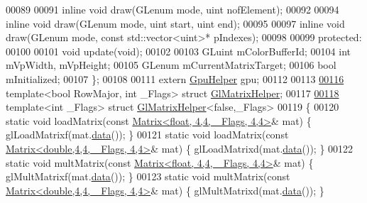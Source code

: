 \begin{DoxyCode}
00089 
00091     \textcolor{keyword}{inline} \textcolor{keywordtype}{void} draw(GLenum mode, uint nofElement);
00092 
00094     \textcolor{keyword}{inline} \textcolor{keywordtype}{void} draw(GLenum mode, uint start, uint end);
00095 
00097     \textcolor{keyword}{inline} \textcolor{keywordtype}{void} draw(GLenum mode, \textcolor{keyword}{const} std::vector<uint>* pIndexes);
00098 
00099 \textcolor{keyword}{protected}:
00100 
00101     \textcolor{keywordtype}{void} update(\textcolor{keywordtype}{void});
00102 
00103     GLuint mColorBufferId;
00104     \textcolor{keywordtype}{int} mVpWidth, mVpHeight;
00105     GLenum mCurrentMatrixTarget;
00106     \textcolor{keywordtype}{bool} mInitialized;
00107 \};
00108 
00111 \textcolor{keyword}{extern} \hyperlink{class_gpu_helper}{GpuHelper} gpu;
00112 
00113 
\hyperlink{struct_gl_matrix_helper}{00116} \textcolor{keyword}{template}<\textcolor{keywordtype}{bool} RowMajor, \textcolor{keywordtype}{int} \_Flags> \textcolor{keyword}{struct }\hyperlink{struct_gl_matrix_helper}{GlMatrixHelper};
00117 
\hyperlink{struct_gl_matrix_helper_3_01false_00_01___flags_01_4}{00118} \textcolor{keyword}{template}<\textcolor{keywordtype}{int} \_Flags> \textcolor{keyword}{struct }\hyperlink{struct_gl_matrix_helper}{GlMatrixHelper}<false,\_Flags>
00119 \{
00120     \textcolor{keyword}{static} \textcolor{keywordtype}{void} loadMatrix(\textcolor{keyword}{const} \hyperlink{group___core___module_class_eigen_1_1_matrix}{Matrix<float, 4,4, \_Flags, 4,4>}&  mat) \{ 
      glLoadMatrixf(mat.\hyperlink{class_eigen_1_1_plain_object_base_ac25699535374b1854cf8494e44ad31b2}{data}()); \}
00121     \textcolor{keyword}{static} \textcolor{keywordtype}{void} loadMatrix(\textcolor{keyword}{const} \hyperlink{group___core___module_class_eigen_1_1_matrix}{Matrix<double,4,4, \_Flags, 4,4>}& mat) \{ 
      glLoadMatrixd(mat.\hyperlink{class_eigen_1_1_plain_object_base_ac25699535374b1854cf8494e44ad31b2}{data}()); \}
00122     \textcolor{keyword}{static} \textcolor{keywordtype}{void} multMatrix(\textcolor{keyword}{const} \hyperlink{group___core___module_class_eigen_1_1_matrix}{Matrix<float, 4,4, \_Flags, 4,4>}&  mat) \{ 
      glMultMatrixf(mat.\hyperlink{class_eigen_1_1_plain_object_base_ac25699535374b1854cf8494e44ad31b2}{data}()); \}
00123     \textcolor{keyword}{static} \textcolor{keywordtype}{void} multMatrix(\textcolor{keyword}{const} \hyperlink{group___core___module_class_eigen_1_1_matrix}{Matrix<double,4,4, \_Flags, 4,4>}& mat) \{ 
      glMultMatrixd(mat.\hyperlink{class_eigen_1_1_plain_object_base_ac25699535374b1854cf8494e44ad31b2}{data}()); \}

\end{DoxyCode}
